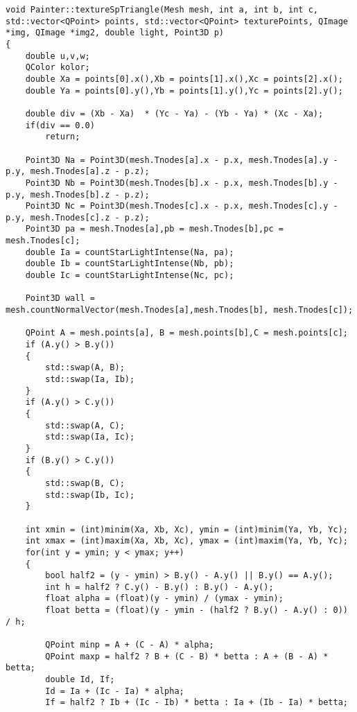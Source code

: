 \begin{center}
\captionsetup{justification=raggedright,singlelinecheck=off}
\begin{lstlisting}[label=lst:zbuff,caption=Алгоритм z-буфера с закраской по Гуро]
void Painter::textureSpTriangle(Mesh mesh, int a, int b, int c, std::vector<QPoint> points, std::vector<QPoint> texturePoints, QImage *img, QImage *img2, double light, Point3D p)
{
    double u,v,w;
    QColor kolor;
    double Xa = points[0].x(),Xb = points[1].x(),Xc = points[2].x();
    double Ya = points[0].y(),Yb = points[1].y(),Yc = points[2].y();

    double div = (Xb - Xa)  * (Yc - Ya) - (Yb - Ya) * (Xc - Xa);
    if(div == 0.0)
        return;

    Point3D Na = Point3D(mesh.Tnodes[a].x - p.x, mesh.Tnodes[a].y - p.y, mesh.Tnodes[a].z - p.z);
    Point3D Nb = Point3D(mesh.Tnodes[b].x - p.x, mesh.Tnodes[b].y - p.y, mesh.Tnodes[b].z - p.z);
    Point3D Nc = Point3D(mesh.Tnodes[c].x - p.x, mesh.Tnodes[c].y - p.y, mesh.Tnodes[c].z - p.z);
    Point3D pa = mesh.Tnodes[a],pb = mesh.Tnodes[b],pc = mesh.Tnodes[c];
    double Ia = countStarLightIntense(Na, pa);
    double Ib = countStarLightIntense(Nb, pb);
    double Ic = countStarLightIntense(Nc, pc);

    Point3D wall = mesh.countNormalVector(mesh.Tnodes[a],mesh.Tnodes[b], mesh.Tnodes[c]);

    QPoint A = mesh.points[a], B = mesh.points[b],C = mesh.points[c];
    if (A.y() > B.y())
    {
        std::swap(A, B);
        std::swap(Ia, Ib);
    }
    if (A.y() > C.y())
    {
        std::swap(A, C);
        std::swap(Ia, Ic);
    }
    if (B.y() > C.y())
    {
        std::swap(B, C);
        std::swap(Ib, Ic);
    }

    int xmin = (int)minim(Xa, Xb, Xc), ymin = (int)minim(Ya, Yb, Yc);
    int xmax = (int)maxim(Xa, Xb, Xc), ymax = (int)maxim(Ya, Yb, Yc);
    for(int y = ymin; y < ymax; y++)
    {
        bool half2 = (y - ymin) > B.y() - A.y() || B.y() == A.y();
        int h = half2 ? C.y() - B.y() : B.y() - A.y();
        float alpha = (float)(y - ymin) / (ymax - ymin);
        float betta = (float)(y - ymin - (half2 ? B.y() - A.y() : 0)) / h;

        QPoint minp = A + (C - A) * alpha;
        QPoint maxp = half2 ? B + (C - B) * betta : A + (B - A) * betta;
        double Id, If;
        Id = Ia + (Ic - Ia) * alpha;
        If = half2 ? Ib + (Ic - Ib) * betta : Ia + (Ib - Ia) * betta;


\end{lstlisting}
\end{center}
